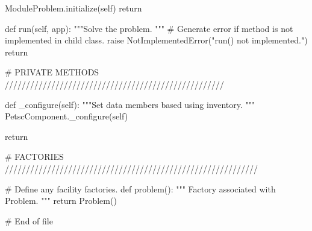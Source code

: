 \begin{python}
        ModuleProblem.initialize(self)
        return

    def run(self, app):
        """Solve the problem.
        """
        # Generate error if method is not implemented in child class.
        raise NotImplementedError("run() not implemented.")
        return

    # PRIVATE METHODS ////////////////////////////////////////////////////

    def _configure(self):
        """Set data members based using inventory.
        """
        PetscComponent._configure(self)

        return

# FACTORIES ////////////////////////////////////////////////////////////

# Define any facility factories.
def problem():
    """
    Factory associated with Problem.
    """
    return Problem()


# End of file
\end{python}



